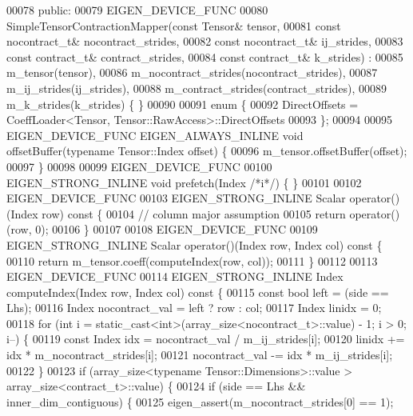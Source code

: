 \begin{DoxyCode}
00078   \textcolor{keyword}{public}:
00079   EIGEN\_DEVICE\_FUNC
00080   SimpleTensorContractionMapper(\textcolor{keyword}{const} Tensor& tensor,
00081                                 \textcolor{keyword}{const} nocontract\_t& nocontract\_strides,
00082                                 \textcolor{keyword}{const} nocontract\_t& ij\_strides,
00083                                 \textcolor{keyword}{const} contract\_t& contract\_strides,
00084                                 \textcolor{keyword}{const} contract\_t& k\_strides) :
00085       m\_tensor(tensor),
00086       m\_nocontract\_strides(nocontract\_strides),
00087       m\_ij\_strides(ij\_strides),
00088       m\_contract\_strides(contract\_strides),
00089       m\_k\_strides(k\_strides) \{ \}
00090 
00091   \textcolor{keyword}{enum} \{
00092     DirectOffsets = CoeffLoader<Tensor, Tensor::RawAccess>::DirectOffsets
00093   \};
00094 
00095   EIGEN\_DEVICE\_FUNC EIGEN\_ALWAYS\_INLINE \textcolor{keywordtype}{void} offsetBuffer(\textcolor{keyword}{typename} Tensor::Index offset) \{
00096     m\_tensor.offsetBuffer(offset);
00097   \}
00098 
00099   EIGEN\_DEVICE\_FUNC
00100   EIGEN\_STRONG\_INLINE \textcolor{keywordtype}{void} prefetch(Index \textcolor{comment}{/*i*/}) \{ \}
00101 
00102   EIGEN\_DEVICE\_FUNC
00103   EIGEN\_STRONG\_INLINE Scalar operator()(Index row)\textcolor{keyword}{ const }\{
00104     \textcolor{comment}{// column major assumption}
00105     \textcolor{keywordflow}{return} operator()(row, 0);
00106   \}
00107 
00108   EIGEN\_DEVICE\_FUNC
00109   EIGEN\_STRONG\_INLINE Scalar operator()(Index row, Index col)\textcolor{keyword}{ const }\{
00110     \textcolor{keywordflow}{return} m\_tensor.coeff(computeIndex(row, col));
00111   \}
00112 
00113   EIGEN\_DEVICE\_FUNC
00114   EIGEN\_STRONG\_INLINE Index computeIndex(Index row, Index col)\textcolor{keyword}{ const }\{
00115     \textcolor{keyword}{const} \textcolor{keywordtype}{bool} left = (side == Lhs);
00116     Index nocontract\_val = left ? row : col;
00117     Index linidx = 0;
00118     \textcolor{keywordflow}{for} (\textcolor{keywordtype}{int} i = static\_cast<int>(array\_size<nocontract\_t>::value) - 1; i > 0; i--) \{
00119       \textcolor{keyword}{const} Index idx = nocontract\_val / m\_ij\_strides[i];
00120       linidx += idx * m\_nocontract\_strides[i];
00121       nocontract\_val -= idx * m\_ij\_strides[i];
00122     \}
00123     \textcolor{keywordflow}{if} (array\_size<typename Tensor::Dimensions>::value > array\_size<contract\_t>::value) \{
00124       \textcolor{keywordflow}{if} (side == Lhs && inner\_dim\_contiguous) \{
00125         eigen\_assert(m\_nocontract\_strides[0] == 1);

\end{DoxyCode}
